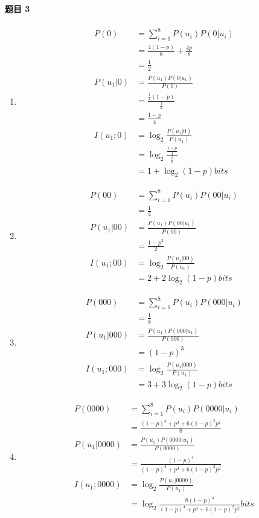 \documentclass{ctexart}
\begin{document}
\paragraph{题目 3} 

\begin{enumerate}
    \item\begin{align}
        P(0) &= \sum_{i=1}^8 P(u_i)P(0|u_i) \\
        &= \frac{4(1 - p)}{8} + \frac{4p}{8} \\
        &= \frac{1}{2} \\
        P(u_1|0) &= \frac{P(u_1)P(0|u_1)}{P(0)} \\
        &= \frac{\frac{1}{8}(1 - p)}{\frac{1}{2}} \\
        &= \frac{1 - p}{4} \\
        I(u_1; 0) &= \log_2 \frac{P(u_1|0)}{P(u_1)} \\
        &= \log_2 \frac{\frac{1 - p}{4}}{\frac{1}{8}} \\
        &= 1 + \log_2 (1 - p) bits
    \end{align}
    \item\begin{align}
        P(00) &= \sum_{i=1}^8 P(u_i)P(00|u_i) \\
        &= \frac{1}{4} \\
        P(u_1|00) &= \frac{P(u_1)P(00|u_1)}{P(00)} \\
        &= \frac{{1 - p}^2}{2} \\
        I(u_1; 00) &= \log_2 \frac{P(u_1|00)}{P(u_1)} \\
        &= 2 + 2\log_2 (1 - p) bits
    \end{align}
    \item\begin{align}
        P(000) &= \sum_{i=1}^8 P(u_i)P(000|u_i) \\
        &= \frac{1}{8} \\
        P(u_1|000) &= \frac{P(u_1)P(000|u_1)}{P(000)} \\
        &= (1 - p)^3 \\
        I(u_1; 000) &= \log_2 \frac{P(u_1|000)}{P(u_1)} \\
        &= 3 + 3\log_2 (1 - p) bits
    \end{align}
    \item\begin{align}
        P(0000) &= \sum_{i=1}^8 P(u_i)P(0000|u_i) \\
        &= \frac{(1 - p)^4 + p^4 + 6(1 - p)^2p^2}{8} \\
        P(u_1|0000) &= \frac{P(u_1)P(0000|u_1)}{P(0000)} \\
        &= \frac{(1 - p)^4}{(1 - p)^4 + p^4 + 6(1 - p)^2p^2} \\
        I(u_1; 0000) &= \log_2 \frac{P(u_1|0000)}{P(u_1)} \\
        &= \log_2 \frac{8(1 - p)^4}{(1 - p)^4 + p^4 + 6(1 - p)^2p^2} bits
    \end{align}
\end{enumerate}


 
\end{document}
